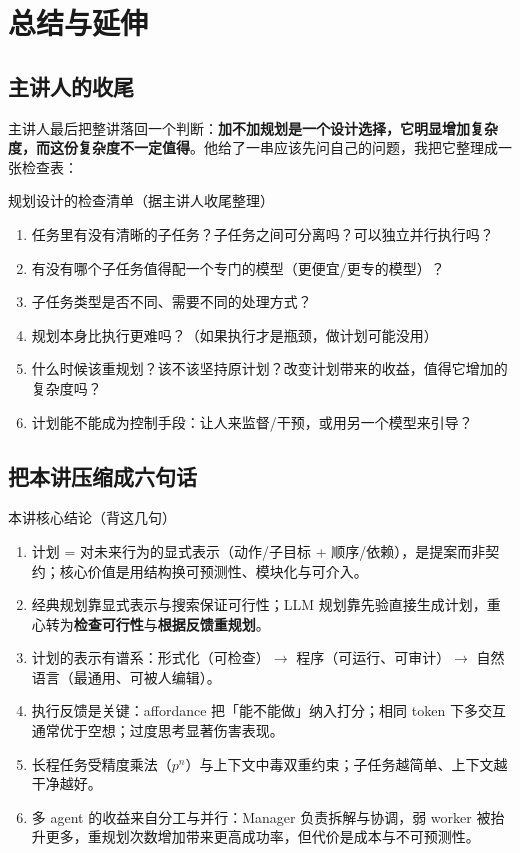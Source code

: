 \documentclass[a4paper]{article}
\begin{document}
\section{总结与延伸}

\subsection{主讲人的收尾}

主讲人最后把整讲落回一个判断：\textbf{加不加规划是一个设计选择，它明显增加复杂度，而这份复杂度不一定值得}。他给了一串应该先问自己的问题，我把它整理成一张检查表：

\begin{importantbox}{规划设计的检查清单（据主讲人收尾整理）}
\begin{enumerate}
\item 任务里有没有清晰的子任务？子任务之间可分离吗？可以独立并行执行吗？
\item 有没有哪个子任务值得配一个专门的模型（更便宜/更专的模型）？
\item 子任务类型是否不同、需要不同的处理方式？
\item 规划本身比执行更难吗？（如果执行才是瓶颈，做计划可能没用）
\item 什么时候该重规划？该不该坚持原计划？改变计划带来的收益，值得它增加的复杂度吗？
\item 计划能不能成为控制手段：让人来监督/干预，或用另一个模型来引导？
\end{enumerate}
\end{importantbox}

\subsection{把本讲压缩成六句话}

\begin{importantbox}{本讲核心结论（背这几句）}
\begin{enumerate}
\item 计划 = 对未来行为的显式表示（动作/子目标 + 顺序/依赖），是提案而非契约；核心价值是用结构换可预测性、模块化与可介入。
\item 经典规划靠显式表示与搜索保证可行性；LLM 规划靠先验直接生成计划，重心转为\textbf{检查可行性}与\textbf{根据反馈重规划}。
\item 计划的表示有谱系：形式化（可检查）$\rightarrow$ 程序（可运行、可审计）$\rightarrow$ 自然语言（最通用、可被人编辑）。
\item 执行反馈是关键：affordance 把「能不能做」纳入打分；相同 token 下多交互通常优于空想；过度思考显著伤害表现。
\item 长程任务受精度乘法（$p^n$）与上下文中毒双重约束；子任务越简单、上下文越干净越好。
\item 多 agent 的收益来自分工与并行：Manager 负责拆解与协调，弱 worker 被抬升更多，重规划次数增加带来更高成功率，但代价是成本与不可预测性。
\end{enumerate}
\end{importantbox}
\end{document}
